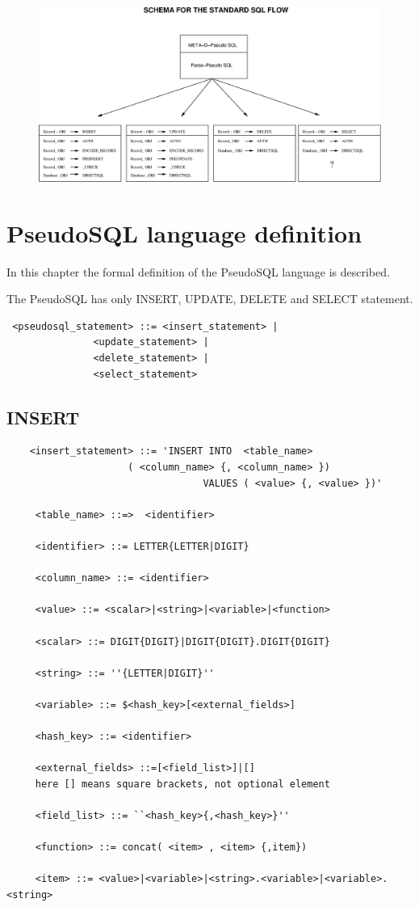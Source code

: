 \begin{figure}
   \centering
   \includegraphics[scale=0.5]{./meta-layer/meta2.eps}
   \caption{}
   \label{fig:meta2}
\end{figure}

 
\section{PseudoSQL language definition}

In this chapter the formal definition of the PseudoSQL language is described.

The PseudoSQL has only INSERT, UPDATE, DELETE and SELECT  statement.

\begin{verbatim}
 <pseudosql_statement> ::= <insert_statement> |
 			   <update_statement> |
			   <delete_statement> |
			   <select_statement> 
 \end{verbatim}


\subsection{INSERT}
\begin{verbatim}
    <insert_statement> ::= 'INSERT INTO  <table_name>
    				 ( <column_name> {, <column_name> })
                                  VALUES ( <value> {, <value> })'

	 <table_name> ::=>  <identifier> 

	 <identifier> ::= LETTER{LETTER|DIGIT}

	 <column_name> ::= <identifier> 

	 <value> ::= <scalar>|<string>|<variable>|<function> 

	 <scalar> ::= DIGIT{DIGIT}|DIGIT{DIGIT}.DIGIT{DIGIT}

	 <string> ::= ''{LETTER|DIGIT}''

	 <variable> ::= $<hash_key>[<external_fields>]

	 <hash_key> ::= <identifier> 

	 <external_fields> ::=[<field_list>]|[] 
	 here [] means square brackets, not optional element

	 <field_list> ::= ``<hash_key>{,<hash_key>}''

	 <function> ::= concat( <item> , <item> {,item})

	 <item> ::= <value>|<variable>|<string>.<variable>|<variable>.<string> 

\end{verbatim}

